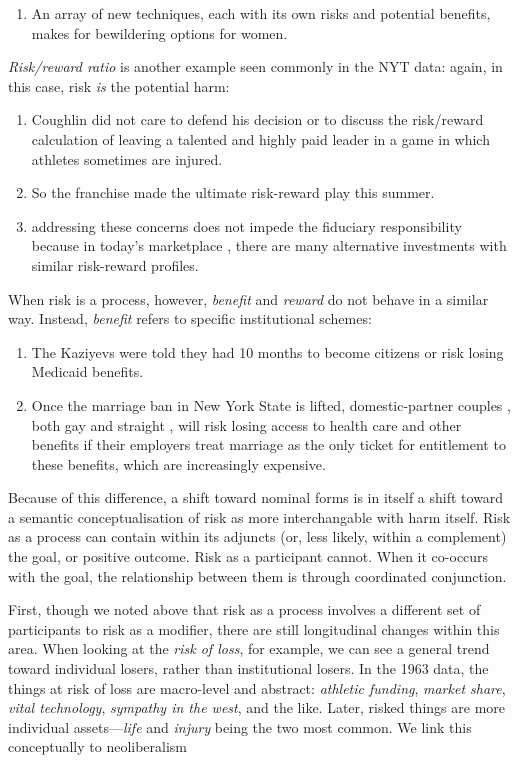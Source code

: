 \begin{enumerate} [before=\itshape,font=\normalfont] \setlength\itemsep{0em} \small\item An array of new techniques, each with its own risks and potential benefits, makes for bewildering options for women.
\end{enumerate}
%
\emph{Risk/reward ratio} is another example seen commonly in the NYT data: again, in this case, risk \emph{is} the potential harm:
%
\begin{enumerate} [before=\itshape,font=\normalfont] \setlength\itemsep{0em} \small\item Coughlin did not care to defend his decision or to discuss the  risk\slash reward calculation of leaving a talented and highly paid leader in a game in which athletes sometimes are injured.\item So the franchise made the ultimate risk-reward play this summer.\item addressing these concerns does not impede the fiduciary responsibility because in today's marketplace , there are many alternative investments with similar risk-reward profiles.
\end{enumerate}
%
When risk is a process, however, \emph{benefit} and \emph{reward} do not behave in a similar way. Instead, \emph{benefit} refers to specific institutional schemes:
%
\begin{enumerate} [before=\itshape,font=\normalfont] \setlength\itemsep{0em} \small\item The Kaziyevs were told they had 10 months to become citizens or risk losing Medicaid benefits.\item Once the marriage ban in New York State is lifted, domestic-partner couples , both gay and straight , will risk losing access to health care and other benefits if their employers treat marriage as the only ticket for entitlement to these benefits, which are increasingly expensive.
\end{enumerate}
%
Because of this difference, a shift toward nominal forms is in itself a shift toward a semantic conceptualisation of risk as more interchangable with harm itself. Risk as a process can contain within its adjuncts (or, less likely, within a complement) the goal, or positive outcome. Risk as a participant cannot. When it co-occurs with the goal, the relationship between them is through coordinated conjunction.

First, though we noted above that risk as a process involves a different set of participants to risk as a modifier, there are still longitudinal changes within this area. When looking at the \emph{risk of loss}, for example, we can see a general trend toward individual losers, rather than institutional losers. In the 1963 data, the things at risk of loss are macro-level and abstract: \emph{athletic funding}, \emph{market share}, \emph{vital technology}, \emph{sympathy in the west}, and the like. Later, risked things are more individual assets---\emph{life} and \emph{injury} being the two most common. We link this conceptually to neoliberalism

